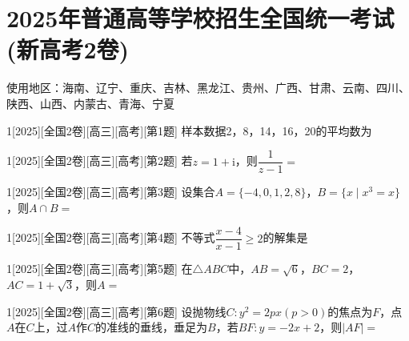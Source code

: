 \section{2025年普通高等学校招生全国统一考试(新高考2卷)}
使用地区：海南、辽宁、重庆、吉林、黑龙江、贵州、广西、甘肃、云南、四川、陕西、山西、内蒙古、青海、宁夏
\begin{example}{1}[2025][全国2卷][高三][高考][第1题]
样本数据2，8，14，16，20的平均数为\blankbox
\begin{choices}
\end{choices}
\end{example}

\begin{example}{1}[2025][全国2卷][高三][高考][第2题]
若$z=1+\text{i}$，则$\dfrac{1}{z-1}=$\blankbox
\begin{choices}
\end{choices}
\end{example}

\begin{example}{1}[2025][全国2卷][高三][高考][第3题]
设集合$A=\{-4,0,1,2,8\}$，$B=\{x\mid x^3=x\}$，则$A\cap B=$\blankbox
\begin{choices}
\end{choices}
\end{example}

\begin{example}{1}[2025][全国2卷][高三][高考][第4题]
不等式$\dfrac{x-4}{x-1}\ge 2$的解集是\blankbox
\begin{choices}
\end{choices}
\end{example}

\begin{example}{1}[2025][全国2卷][高三][高考][第5题]
在$\triangle ABC$中，$AB=\sqrt{6}$，$BC=2$，$AC=1+\sqrt{3}$，则$A=$\blankbox
\begin{choices}
\end{choices}
\end{example}

\begin{example}{1}[2025][全国2卷][高三][高考][第6题]
设抛物线$C:y^2=2px(p>0)$的焦点为$F$，点$A$在$C$上，过$A$作$C$的准线的垂线，垂足为$B$，若$BF:y=-2x+2$，则$|AF|=$\blankbox
\begin{choices}
\end{choices}
\end{example}

